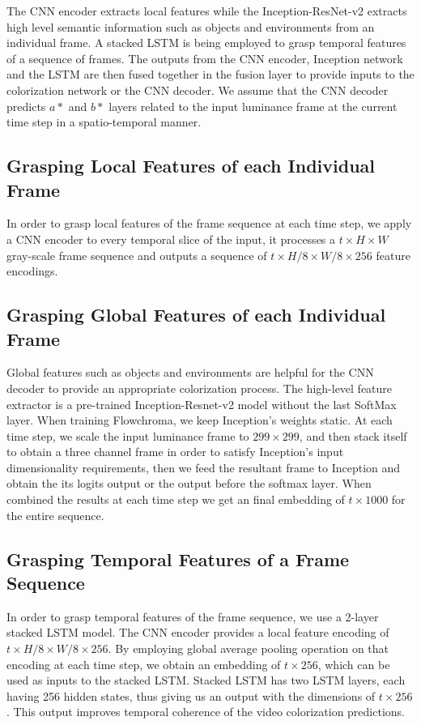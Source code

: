 \documentclass[10pt,twocolumn,letterpaper]{article}
\begin{document}
The CNN encoder extracts local features while the Inception-ResNet-v2 extracts high level semantic information such as objects and environments from an individual frame. A stacked LSTM is being employed to grasp temporal features of a sequence of frames. The outputs from the CNN encoder, Inception network and the LSTM are then fused together in the fusion layer to provide inputs to the colorization network or the CNN decoder. We assume that the CNN decoder predicts $a*$ and $b*$ layers related to the input luminance frame at the current time step in a spatio-temporal manner.

\subsection{Grasping Local Features of each Individual Frame}
In order to grasp local features of the frame sequence at each time step, we apply a CNN encoder to every temporal slice of the input, it processes a $t\times H\times W$ gray-scale frame sequence and outputs a sequence of $t\times H/8\times W/8\times 256$ feature encodings.

\subsection{Grasping Global Features of each Individual Frame}
Global features such as objects and environments are helpful for the CNN decoder to provide an appropriate colorization process. The high-level feature extractor is a pre-trained Inception-Resnet-v2 model without the last SoftMax layer. When training Flowchroma, we keep Inception’s weights static. At each time step, we scale the input luminance frame to $299\times 299$, and then stack itself to obtain a three channel frame in order to satisfy Inception’s input dimensionality requirements, then we feed the resultant frame to Inception and obtain the its logits output or the output before the softmax layer. When combined the results at each time step we get an final embedding of $t\times 1000$ for the entire sequence.


\subsection{Grasping Temporal Features of a Frame Sequence}
In order to grasp temporal features of the frame sequence, we use a 2-layer stacked LSTM model. The CNN encoder provides a local feature encoding of  $t\times H/8\times W/8\times 256$. By employing global average pooling operation on that encoding at each time step, we obtain an embedding of $t\times 256$, which can be used as inputs to the stacked LSTM. Stacked LSTM has two LSTM layers, each having 256 hidden states, thus giving us an output with the dimensions of $t\times 256$. This output improves temporal coherence of the video colorization predictions.
\end{document}
